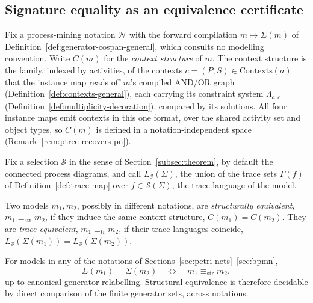 \subsection{Signature equality as an equivalence certificate}\label{subsec:equiv-certificate}

Fix a process-mining notation $\mathcal{N}$ with the forward compilation $m\mapsto\Sigma(m)$ of
Definition~\ref{def:generator-cospan-general}, which consults no modelling convention. Write $C(m)$ for
the \emph{context structure} of $m$. The context structure is the family, indexed by activities, of the contexts
$c=(P,S)\in\mathrm{Contexts}(a)$ that the instance map reads off $m$'s compiled AND/OR graph
(Definition~\ref{def:contexts-general}), each carrying its constraint system $\Lambda_{a,c}$
(Definition~\ref{def:multiplicity-decoration}), compared by its solutions. All
four instance maps emit contexts in this one format, over the shared activity set and object types,
so $C(m)$ is defined in a notation-independent space (Remark~\ref{rem:ptree-recovers-pn}).

Fix a selection $\mathcal{S}$ in the sense of Section~\ref{subsec:theorem}, by default the
connected process diagrams, and call $L_{\mathcal{S}}(\Sigma)$, the union of the trace sets
$\Gamma(f)$ of Definition~\ref{def:trace-map} over $f\in\mathcal{S}(\Sigma)$, the trace language
of the model.

\begin{definition}\label{def:str-tr-equiv}
  Two models $m_1,m_2$, possibly in different notations, are \emph{structurally equivalent},
  $m_1\equiv_{\mathrm{str}}m_2$, if they induce the same context structure, $C(m_1)=C(m_2)$. They
  are \emph{trace-equivalent}, $m_1\equiv_{\mathrm{tr}}m_2$, if their trace languages coincide,
  $L_{\mathcal{S}}(\Sigma(m_1))=L_{\mathcal{S}}(\Sigma(m_2))$.
\end{definition}

\begin{lemma}\label{lem:sig-complete}
  For models in any of the notations of Sections~\ref{sec:petri-nets}--\ref{sec:bpmn},
  \[
    \Sigma(m_1)=\Sigma(m_2) \quad\Longleftrightarrow\quad m_1\equiv_{\mathrm{str}}m_2,
  \]
  up to canonical generator relabelling. Structural equivalence is therefore decidable by direct
  comparison of the finite generator sets, across notations.
\end{lemma}

